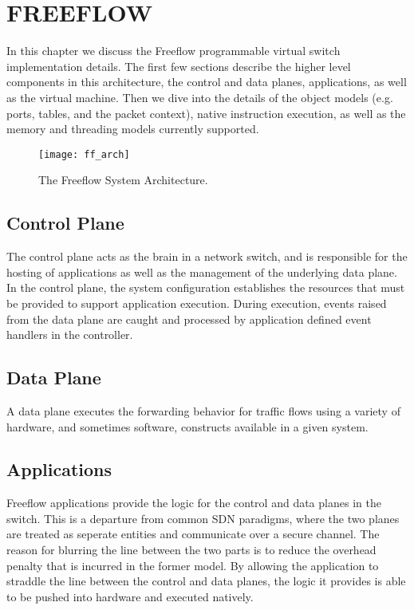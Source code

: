 \chapter{FREEFLOW}
\label{ff}
In this chapter we discuss the Freeflow programmable virtual switch
implementation details. The first few sections describe the higher level
components in this architecture, the control and data planes, applications, as
well as the virtual machine. Then we dive into the details of the object
models (e.g. ports, tables, and the packet context), native instruction
execution, as well as the memory and threading models currently supported.

\begin{figure}[h]
\centering
\texttt{[image: ff\_arch]}
\caption{The Freeflow System Architecture.}
\label{ff_arch}
\end{figure}

\section{Control Plane}
\label{ff:cp}
The control plane acts as the brain in a network switch, and is responsible for
the hosting of applications as well as the management of the underlying data
plane. In the control plane, the system configuration establishes the resources
that must be provided to support application execution. During execution,
events raised from the data plane are caught and processed by application
defined event handlers in the controller.

\section{Data Plane}
\label{ff:dp}
A data plane executes the forwarding behavior for traffic flows using a variety
of hardware, and sometimes software, constructs available in a given system.

\section{Applications}
\label{ff:app}
Freeflow applications provide the logic for the control and data planes in the
switch. This is a departure from common SDN paradigms, where the two planes are
treated as seperate entities and communicate over a secure channel. The reason
for blurring the line between the two parts is to reduce the overhead penalty
that is incurred in the former model. By allowing the application to straddle
the line between the control and data planes, the logic it provides is able
to be pushed into hardware and executed natively.

